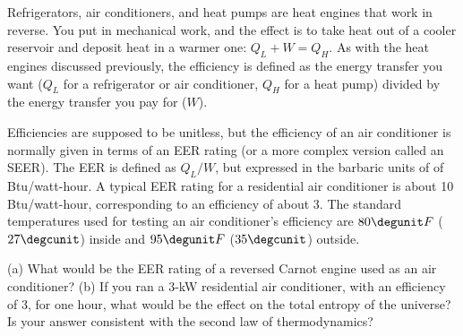 Refrigerators, air conditioners, and heat pumps are heat engines that
work in reverse.
You put in mechanical work, and the effect is to take heat out of
a cooler reservoir and deposit heat in a warmer one: $Q_L+W=Q_H$.
As with the heat engines discussed previously, the efficiency is
defined as the energy transfer you want ($Q_L$ for a refrigerator or
air conditioner, $Q_H$ for a heat pump) divided by the energy transfer
you pay for ($W$).

Efficiencies are supposed to be unitless, but the
efficiency of an air conditioner is normally given in terms of an EER rating
(or a more complex version called an SEER). The EER is defined
as $Q_L/W$, but expressed in the barbaric units of of Btu/watt-hour.
A typical EER rating
for a residential air conditioner is about 10 Btu/watt-hour, corresponding to an
efficiency of about 3.
The standard temperatures used for testing an air conditioner's efficiency
are $80\degunit F$ ($27\degcunit$) inside and
 $95\degunit F$ ($35\degcunit$) outside.

\noindent (a) What would be the EER rating of a reversed Carnot engine used as
an air conditioner? \answercheck\hwendpart
(b) If you ran a 3-kW residential air conditioner, with an efficiency of 3,
 for one hour, what would
be the effect on the total entropy of the universe? Is your answer
consistent with the second law of thermodynamics? \answercheck
